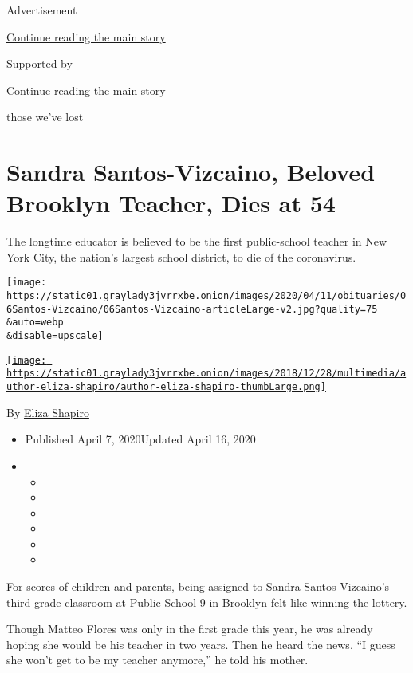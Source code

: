Advertisement

\protect\hyperlink{after-top}{Continue reading the main story}

Supported by

\protect\hyperlink{after-sponsor}{Continue reading the main story}

those we've lost

\hypertarget{sandra-santos-vizcaino-beloved-brooklyn-teacher-dies-at-54}{%
\section{Sandra Santos-Vizcaino, Beloved Brooklyn Teacher, Dies at
54}\label{sandra-santos-vizcaino-beloved-brooklyn-teacher-dies-at-54}}

The longtime educator is believed to be the first public-school teacher
in New York City, the nation's largest school district, to die of the
coronavirus.

\texttt{[image: https://static01.graylady3jvrrxbe.onion/images/2020/04/11/obituaries/06Santos-Vizcaino/06Santos-Vizcaino-articleLarge-v2.jpg?quality=75\\\&auto=webp\\\&disable=upscale]}

\href{https://www.nytimes3xbfgragh.onion/by/eliza-shapiro}{\texttt{[image: https://static01.graylady3jvrrxbe.onion/images/2018/12/28/multimedia/author-eliza-shapiro/author-eliza-shapiro-thumbLarge.png]}}

By \href{https://www.nytimes3xbfgragh.onion/by/eliza-shapiro}{Eliza
Shapiro}

\begin{itemize}
\item
  Published April 7, 2020Updated April 16, 2020
\item
  \begin{itemize}
  \item
  \item
  \item
  \item
  \item
  \item
  \end{itemize}
\end{itemize}

For scores of children and parents, being assigned to Sandra
Santos-Vizcaino's third-grade classroom at Public School 9 in Brooklyn
felt like winning the lottery.

Though Matteo Flores was only in the first grade this year, he was
already hoping she would be his teacher in two years. Then he heard the
news. ``I guess she won't get to be my teacher anymore,'' he told his
mother.

